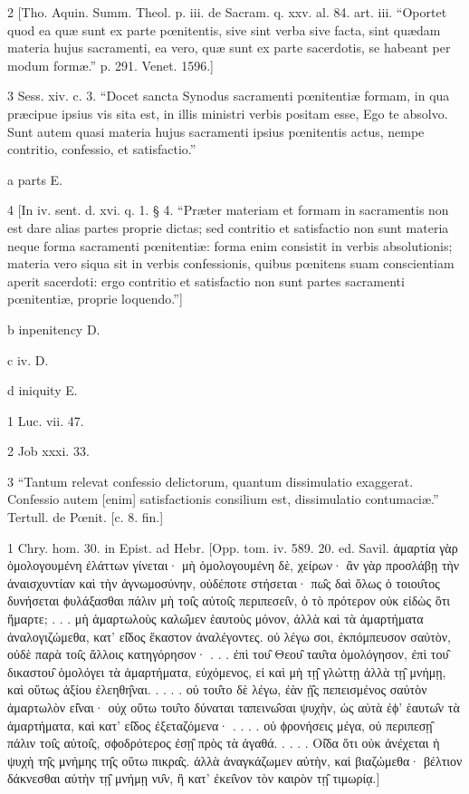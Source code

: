 2
[Tho. Aquin. Summ. Theol. p. iii. de Sacram. q. xxv. al. 84. art. iii. “Oportet quod ea quæ sunt ex parte pœnitentis, sive sint verba sive facta, sint quædam materia hujus sacramenti, ea vero, quæ sunt ex parte sacerdotis, se habeant per modum formæ.” p. 291. Venet. 1596.]

3
Sess. xiv. c. 3. “Docet sancta Synodus sacramenti pœnitentiæ formam, in qua præcipue ipsius vis sita est, in illis ministri verbis positam esse, Ego te absolvo. Sunt autem quasi materia hujus sacramenti ipsius pœnitentis actus, nempe contritio, confessio, et satisfactio.”

a
parts E.

4
[In iv. sent. d. xvi. q. 1. § 4. “Præter materiam et formam in sacramentis non est dare alias partes proprie dictas; sed contritio et satisfactio non sunt materia neque forma sacramenti pœnitentiæ: forma enim consistit in verbis absolutionis; materia vero siqua sit in verbis confessionis, quibus pœnitens suam conscientiam aperit sacerdoti: ergo contritio et satisfactio non sunt partes sacramenti pœnitentiæ, proprie loquendo.”]

b
inpenitency D.

c
iv. D.

d
iniquity E.

1
Luc. vii. 47.

2
Job xxxi. 33.

3
“Tantum relevat confessio delictorum, quantum dissimulatio exaggerat. Confessio autem [enim] satisfactionis consilium est, dissimulatio contumaciæ.” Tertull. de Pœnit. [c. 8. fin.]

1
Chry. hom. 30. in Epist. ad Hebr. [Opp. tom. iv. 589. 20. ed. Savil. ἁμαρτία γὰρ ὁμολογουμένη ἐλάττων γίνεται· μὴ ὁμολογουμένη δὲ, χείρων· ἂν γὰρ προσλάβῃ τὴν ἀναισχυντίαν καὶ τὴν ἀγνωμοσύνην, οὐδέποτε στήσεται· πω̑ς δαὶ ὅλως ὁ τοιου̑τος δυνήσεται ϕυλάξασθαι πάλιν μὴ τοι̑ς αὐτοι̑ς περιπεσει̑ν, ὁ τὸ πρότερον οὐκ εἰδὼς ὅτι ἥμαρτε; . . . μὴ ἁμαρτωλοὺς καλω̑μεν ἑαυτοὺς μόνον, ἀλλὰ καὶ τὰ ἁμαρτήματα ἀναλογιζώμεθα, κατ’ εἰ̑δος ἕκαστον ἀναλέγοντες. οὐ λέγω σοι, ἐκπόμπευσον σαὐτὸν, οὐδὲ παρὰ τοι̑ς ἄλλοις κατηγόρησον· . . . ἐπὶ του̑ Θεου̑ ταυ̑τα ὁμολόγησον, ἐπὶ του̑ δικαστου̑ ὁμολόγει τὰ ἁμαρτήματα, εὐχόμενος, εἰ καὶ μὴ τῃ̑ γλώττῃ ἀλλὰ τῃ̑ μνήμῃ, καὶ οὕτως ἀξίου ἐλεηθη̑ναι. . . . . οὐ του̑το δὲ λέγω, ἐὰν ᾐ̑ς πεπεισμένος σαὐτὸν ἁμαρτωλὸν εἰ̑ναι· οὐχ οὕτω του̑το δύναται ταπεινω̑σαι ψυχὴν, ὡς αὐτὰ ἐϕ’ ἑαυτω̑ν τὰ ἁμαρτήματα, καὶ κατ’ εἰ̑δος ἐξεταζόμενα· . . . . οὐ ϕρονήσεις μέγα, οὐ περιπεσῃ̑ πάλιν τοι̑ς αὐτοι̑ς, σϕοδρότερος ἐσῃ̑ πρὸς τὰ ἀγαθά. . . . . Οἰ̑δα ὅτι οὐκ ἀνέχεται ἡ ψυχὴ τη̑ς μνήμης τη̑ς οὕτω πικρα̑ς. ἀλλὰ ἀναγκάζωμεν αὐτὴν, καὶ βιαζώμεθα· βέλτιον δάκνεσθαι αὐτὴν τῃ̑ μνήμῃ νυ̑ν, ἢ κατ’ ἐκει̑νον τὸν καιρὸν τῃ̑ τιμωρίᾳ.]

